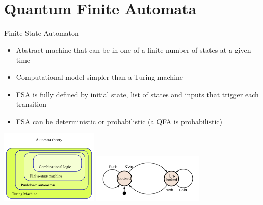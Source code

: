 \documentclass[aspectratio=169,9pt]{beamer}
\begin{document}
\section{Quantum Finite Automata}
\begin{frame}[t]{Finite State Automaton}
  \begin{itemize}
    \item Abstract machine that can be in one of a finite number of states at a given time
    \item Computational model simpler than a Turing machine
    \item FSA is fully defined by initial state, list of states and inputs that trigger each transition
    \item FSA can be deterministic or probabilistic (a QFA is probabilistic)
  \end{itemize}
  \includegraphics[width=0.35\textwidth]{Automata_hierarchy.png}
  \includegraphics[width=0.4\textwidth]{turnstile.png}
\end{frame}
\end{document}
